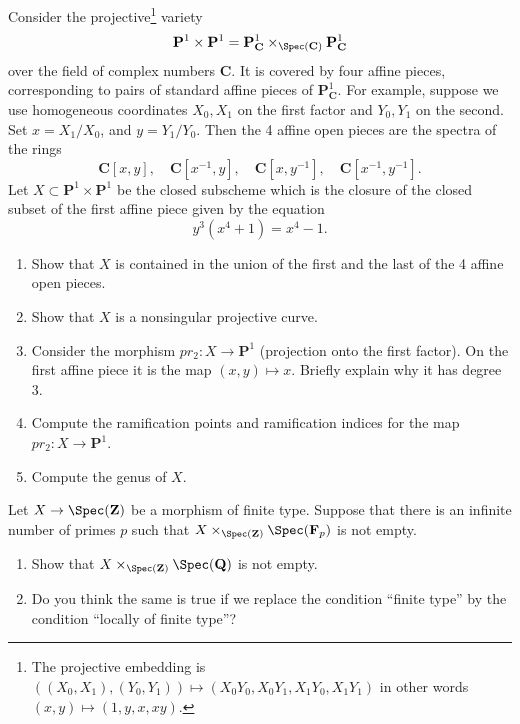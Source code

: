 \begin{exercise}
\label{exercise-curve-p1-p1}
Consider the
projective\footnote{The projective embedding is
$((X_0, X_1), (Y_0, Y_1))\mapsto (X_0Y_0, X_0Y_1, X_1Y_0, X_1Y_1)$
in other words $(x, y)\mapsto (1, y, x, xy)$.} variety
$$
{\mathbf P}^1 \times {\mathbf P}^1 = {\mathbf P}^1_{{\mathbf C}}
\times_{\Spec({\mathbf C})} {\mathbf P}^1_{\mathbf C}
$$
over the field of complex numbers ${\mathbf C}$. It is covered by four affine
pieces,
corresponding to pairs of standard affine pieces of ${\mathbf P}^1_{\mathbf
C}$. For example,
suppose we use homogeneous coordinates $X_0, X_1$ on the first factor and
$Y_0, Y_1$ on the second. Set $x = X_1/X_0$, and $y = Y_1/Y_0$. Then the 4
affine open pieces are the spectra of the  rings
$$
{\mathbf C}[x, y], \quad
{\mathbf C}[x^{-1}, y], \quad
{\mathbf C}[x, y^{-1}], \quad
{\mathbf C}[x^{-1}, y^{-1}].
$$
Let $X \subset {\mathbf P}^1 \times {\mathbf P}^1$ be the closed subscheme
which is the
closure of the closed subset of the first affine piece given by the equation
$$
y^3(x^4 + 1) = x^4 -1.
$$
\begin{enumerate}
\item Show that $X$ is contained in the union of the first and
the last of the 4 affine open pieces.
\item Show that $X$ is a nonsingular projective curve.
\item Consider the morphism $pr_2 : X \to {\mathbf P}^1$ (projection onto
the first factor). On the first affine piece it is the map $(x, y) \mapsto x$.
Briefly explain why it has degree $3$.
\item Compute the ramification points and ramification indices
for the map $pr_2 : X \to {\mathbf P}^1$.
\item Compute the genus of $X$.
\end{enumerate}
\end{exercise}

\begin{exercise}
\label{exercise-finite-type-over-Z}
Let $X \to \Spec({\mathbf Z})$ be a morphism of finite type.
Suppose that there is an infinite number of primes $p$ such that
$X \times_{\Spec({\mathbf Z})} \Spec({\mathbf F}_p)$ is not empty.
\begin{enumerate}
\item Show that $X \times_{\Spec({\mathbf Z})}\Spec(\mathbf{Q})$
is not empty.
\item Do you think the same is true if we replace the condition
``finite type'' by the condition ``locally of finite type''?
\end{enumerate}
\end{exercise}




